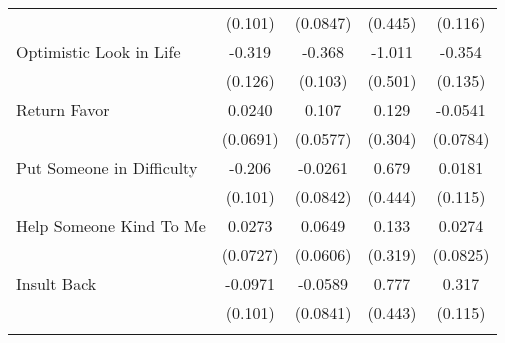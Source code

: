{\begin{tabular}{l*{4}{c}}
            &     (0.101)         &    (0.0847)         &     (0.445)         &     (0.116)         \\
[1em]
Optimistic Look in Life&      -0.319\sym{*}  &      -0.368\sym{***}&      -1.011\sym{*}  &      -0.354\sym{**} \\
            &     (0.126)         &     (0.103)         &     (0.501)         &     (0.135)         \\
[1em]
Return Favor&      0.0240         &       0.107         &       0.129         &     -0.0541         \\
            &    (0.0691)         &    (0.0577)         &     (0.304)         &    (0.0784)         \\
[1em]
Put Someone in Difficulty&      -0.206\sym{*}  &     -0.0261         &       0.679         &      0.0181         \\
            &     (0.101)         &    (0.0842)         &     (0.444)         &     (0.115)         \\
[1em]
Help Someone Kind To Me&      0.0273         &      0.0649         &       0.133         &      0.0274         \\
            &    (0.0727)         &    (0.0606)         &     (0.319)         &    (0.0825)         \\
[1em]
Insult Back &     -0.0971         &     -0.0589         &       0.777         &       0.317\sym{**} \\
            &     (0.101)         &    (0.0841)         &     (0.443)         &     (0.115)         \\
\hline\hline
{}\\
\end{tabular}
}
